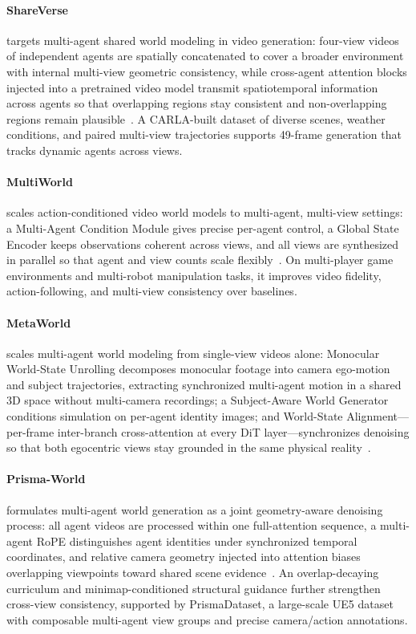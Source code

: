 \paragraph{ShareVerse} targets multi-agent shared world modeling in video generation: four-view videos of independent agents are spatially concatenated to cover a broader environment with internal multi-view geometric consistency, while cross-agent attention blocks injected into a pretrained video model transmit spatiotemporal information across agents so that overlapping regions stay consistent and non-overlapping regions remain plausible~\cite{avg260302697}. A CARLA-built dataset of diverse scenes, weather conditions, and paired multi-view trajectories supports 49-frame generation that tracks dynamic agents across views.

\paragraph{MultiWorld} scales action-conditioned video world models to multi-agent, multi-view settings: a Multi-Agent Condition Module gives precise per-agent control, a Global State Encoder keeps observations coherent across views, and all views are synthesized in parallel so that agent and view counts scale flexibly~\cite{avg260418564}. On multi-player game environments and multi-robot manipulation tasks, it improves video fidelity, action-following, and multi-view consistency over baselines.

\paragraph{MetaWorld} scales multi-agent world modeling from single-view videos alone: Monocular World-State Unrolling decomposes monocular footage into camera ego-motion and subject trajectories, extracting synchronized multi-agent motion in a shared 3D space without multi-camera recordings; a Subject-Aware World Generator conditions simulation on per-agent identity images; and World-State Alignment---per-frame inter-branch cross-attention at every DiT layer---synchronizes denoising so that both egocentric views stay grounded in the same physical reality~\cite{avg260602753}.

\paragraph{Prisma-World} formulates multi-agent world generation as a joint geometry-aware denoising process: all agent videos are processed within one full-attention sequence, a multi-agent RoPE distinguishes agent identities under synchronized temporal coordinates, and relative camera geometry injected into attention biases overlapping viewpoints toward shared scene evidence~\cite{avg260609507}. An overlap-decaying curriculum and minimap-conditioned structural guidance further strengthen cross-view consistency, supported by PrismaDataset, a large-scale UE5 dataset with composable multi-agent view groups and precise camera/action annotations.

